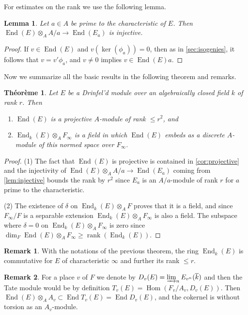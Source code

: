 \documentclass[12pt,a4paper]{article}
\theoremstyle{plain}
\newtheorem{theorem}{Th\'eor\`eme}[section]
\newtheorem{lemma}{Lemma}[section]
\theoremstyle{definition}
\newtheorem{remark}{Remark}[section]
\theoremstyle{remark}
\DeclareMathOperator{\End}{End}
\DeclareMathOperator{\Hom}{Hom}
\providecommand{\Hom}{\operatorname{Hom}}
\providecommand{\End}{\operatorname{End}}
\providecommand{\rank}{\operatorname{rank}}
\begin{document}
For estimates on the rank we use the following lemma.

\begin{lemma}
\label{lem:injective}
Let $a \in A$ be prime to the characteristic of $E$. Then $\End(E) \otimes_A A/a \to \End(E_a)$ is injective.
\end{lemma}

\begin{proof}
If $v \in \End(E)$ and $v(\ker(\phi_a)) = 0$, then as in \eqref{sec:isogenies}, it follows that $v = v' \phi_a$, and $v \neq 0$ implies $v \in \End(E)a$.
\end{proof}

Now we summarize all the basic results in the following theorem and remarks.

\begin{theorem}
\label{thm:end}
Let $E$ be a Drinfel'd module over an algebraically closed field $k$ of rank $r$. Then
\begin{enumerate}[label=(\arabic*)]
\item $\End(E)$ is a projective $A$-module of rank $\leq r^2$, and
\item $\End_k(E) \otimes_A F_\infty$ is a field in which $\End(E)$ embeds as a discrete $A$-module of this normed space over $F_\infty$.
\end{enumerate}
\end{theorem}

\begin{proof}
(1) The fact that $\End(E)$ is projective is contained in \eqref{cor:projective} and the injectivity of $\End(E) \otimes_A A/a \to \End(E_a)$ coming from \eqref{lem:injective} bounds the rank by $r^2$ since $E_a$ is an $A/a$-module of rank $r$ for $a$ prime to the characteristic.

(2) The existence of $\delta$ on $\End_k(E) \otimes_A F$ proves that it is a field, and since $F_\infty/F$ is a separable extension $\End_k(E) \otimes_A F_\infty$ is also a field. The subspace where $\delta = 0$ on $\End_k(E) \otimes_A F_\infty$ is zero since $\dim_F \End(E) \otimes_A F_\infty \geq \rank(\End_k(E))$.
\end{proof}

\begin{remark}
\label{rem:commutative}
With the notations of the previous theorem, the ring $\End_k(E)$ is commutative for $E$ of characteristic $\infty$ and further its rank $\leq r$.
\end{remark}

\begin{remark}
\label{rem:tatemod}
For a place $v$ of $F$ we denote by $D_v(E) = \varinjlim_n E_{v^n}(\overline{k})$ and then the Tate module would be by definition $T_v(E) = \Hom(F_v/A_v, D_v(E))$. Then $\End(E) \otimes_A A_v \subset \End T_v(E) = \End D_v(E)$, and the cokernel is without torsion as an $A_v$-module.
\end{remark}
\end{document}
